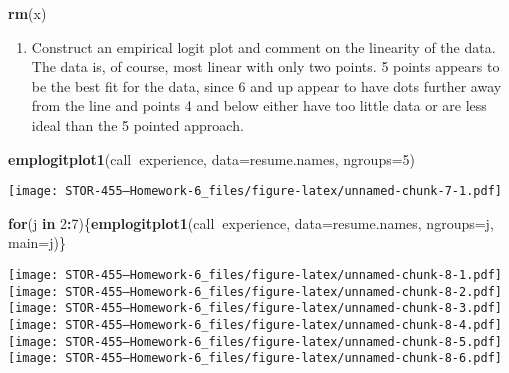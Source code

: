 \documentclass[
]{article}
\newenvironment{Shaded}{\begin{snugshade}}{\end{snugshade}}
\newcommand{\ControlFlowTok}[1]{\textcolor[rgb]{0.13,0.29,0.53}{\textbf{#1}}}
\newcommand{\DataTypeTok}[1]{\textcolor[rgb]{0.13,0.29,0.53}{#1}}
\newcommand{\DecValTok}[1]{\textcolor[rgb]{0.00,0.00,0.81}{#1}}
\newcommand{\KeywordTok}[1]{\textcolor[rgb]{0.13,0.29,0.53}{\textbf{#1}}}
\newcommand{\NormalTok}[1]{#1}
\newcommand{\OperatorTok}[1]{\textcolor[rgb]{0.81,0.36,0.00}{\textbf{#1}}}
\providecommand{\tightlist}{%
  \setlength{\itemsep}{0pt}\setlength{\parskip}{0pt}}
\begin{document}
\begin{Shaded}
\begin{Highlighting}[]
\KeywordTok{rm}\NormalTok{(x)}
\end{Highlighting}
\end{Shaded}

\begin{enumerate}
\def\labelenumi{\arabic{enumi})}
\setcounter{enumi}{3}
\tightlist
\item
  Construct an empirical logit plot and comment on the linearity of the
  data. The data is, of course, most linear with only two points. 5
  points appears to be the best fit for the data, since 6 and up appear
  to have dots further away from the line and points 4 and below either
  have too little data or are less ideal than the 5 pointed approach.
\end{enumerate}

\begin{Shaded}
\begin{Highlighting}[]
\KeywordTok{emplogitplot1}\NormalTok{(call}\OperatorTok{~}\NormalTok{experience, }\DataTypeTok{data=}\NormalTok{resume.names, }\DataTypeTok{ngroups=}\DecValTok{5}\NormalTok{)}
\end{Highlighting}
\end{Shaded}

\texttt{[image: STOR-455---Homework-6\_files/figure-latex/unnamed-chunk-7-1.pdf]}

\begin{Shaded}
\begin{Highlighting}[]
\ControlFlowTok{for}\NormalTok{(j }\ControlFlowTok{in} \DecValTok{2}\OperatorTok{:}\DecValTok{7}\NormalTok{)\{}\KeywordTok{emplogitplot1}\NormalTok{(call}\OperatorTok{~}\NormalTok{experience, }\DataTypeTok{data=}\NormalTok{resume.names, }\DataTypeTok{ngroups=}\NormalTok{j, }\DataTypeTok{main=}\NormalTok{j)\}}
\end{Highlighting}
\end{Shaded}

\texttt{[image: STOR-455---Homework-6\_files/figure-latex/unnamed-chunk-8-1.pdf]}
\texttt{[image: STOR-455---Homework-6\_files/figure-latex/unnamed-chunk-8-2.pdf]}
\texttt{[image: STOR-455---Homework-6\_files/figure-latex/unnamed-chunk-8-3.pdf]}
\texttt{[image: STOR-455---Homework-6\_files/figure-latex/unnamed-chunk-8-4.pdf]}
\texttt{[image: STOR-455---Homework-6\_files/figure-latex/unnamed-chunk-8-5.pdf]}
\texttt{[image: STOR-455---Homework-6\_files/figure-latex/unnamed-chunk-8-6.pdf]}
\end{document}
